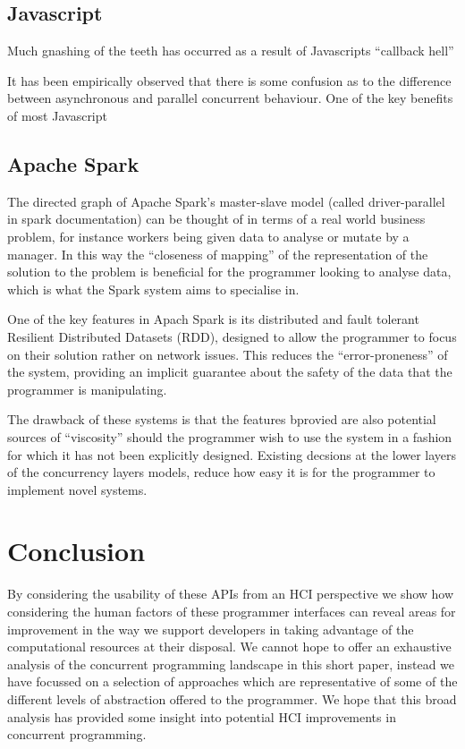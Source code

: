 \documentclass{sig-alternate}
\begin{document}
\subsection{Javascript}


Much gnashing of the teeth has occurred as a result of Javascripts ``callback hell'' \cite{Edwards:2009:CR:1639950.1640058}

It has been empirically observed that there is some confusion as to the difference between asynchronous and parallel concurrent behaviour. One of the key benefits of most Javascript 


\subsection{Apache Spark}
The directed graph of Apache Spark's master-slave model (called driver-parallel in spark documentation) can be thought of in terms of a real world business problem, for instance workers being given data to analyse or mutate by a manager. In this way the ``closeness of mapping'' of the representation of the solution to the problem is beneficial for the programmer looking to analyse data, which is what the Spark system aims to specialise in.

One of the key features in Apach Spark is its distributed and fault tolerant Resilient Distributed Datasets (RDD), designed to allow the programmer to focus on their solution rather on network issues. This reduces the ``error-proneness'' of the system, providing an implicit guarantee about the safety of the data that the programmer is manipulating. 

The drawback of these systems is that the features bprovied are also potential sources of ``viscosity'' should the programmer wish to use the system in a fashion for which it has not been explicitly designed. Existing decsions at the lower layers of the concurrency layers models, reduce how easy it is for the programmer to implement novel systems.

\section{Conclusion}
By considering the usability of these APIs from an HCI perspective we show how considering the human factors of these programmer interfaces can reveal areas for improvement in the way we support developers in taking advantage of the computational resources at their disposal. We cannot hope to offer an exhaustive analysis of the concurrent programming landscape in this short paper, instead we have focussed on a selection of approaches which are representative of some of the different levels of abstraction offered to the programmer. We hope that this broad analysis has provided some insight into potential HCI improvements in concurrent programming.



\end{document}
